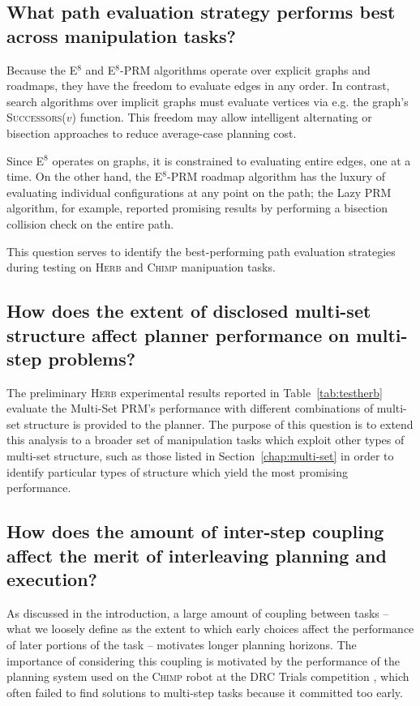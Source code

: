 {\subsection{What path evaluation strategy performs best
   across manipulation tasks?}
\label{ques:evalpath}

Because the E$^8$ and E$^8$-PRM algorithms
operate over explicit graphs and roadmaps,
they have the freedom to evaluate edges in any order.
In contrast, search algorithms over implicit graphs
must evaluate vertices via e.g. the graph's \textsc{Successors($v$)}
function.
This freedom may allow intelligent alternating or bisection approaches
to reduce average-case planning cost.

Since E$^8$ operates on graphs,
it is constrained to evaluating entire edges,
one at a time.
On the other hand,
the E$^8$-PRM roadmap algorithm
has the luxury of evaluating individual configurations at any
point on the path;
the Lazy PRM algorithm, for example,
reported promising results by performing a bisection collision
check on the entire path.

This question serves to identify
the best-performing path evaluation strategies during
testing on \textsc{Herb} and \textsc{Chimp} manipuation tasks.

\subsection{How does the extent of disclosed multi-set structure
   affect planner performance on multi-step problems?}
\label{ques:multi-set-suited}

The preliminary \textsc{Herb} experimental results reported in
Table~\ref{tab:testherb} evaluate the Multi-Set PRM's performance
with different combinations of multi-set structure is provided
to the planner.
The purpose of this question is to extend this analysis to a broader
set of manipulation tasks
which exploit other types of multi-set structure,
such as those listed in Section~\ref{chap:multi-set}
in order to identify particular types of structure which yield
the most promising performance.

\subsection{How does the amount of inter-step coupling
   affect the merit of interleaving planning and execution?}
\label{ques:how-sequence}

As discussed in the introduction,
a large amount of coupling between tasks
-- what we loosely define as the extent to which early choices
affect the performance of later portions of the task --
motivates longer planning horizons.
The importance of considering this coupling is motivated by the
performance of the planning system used on the \textsc{Chimp} robot
at the DRC Trials competition \cite{dellin2014drc},
which often failed to find solutions to multi-step tasks because
it committed too early.

}

